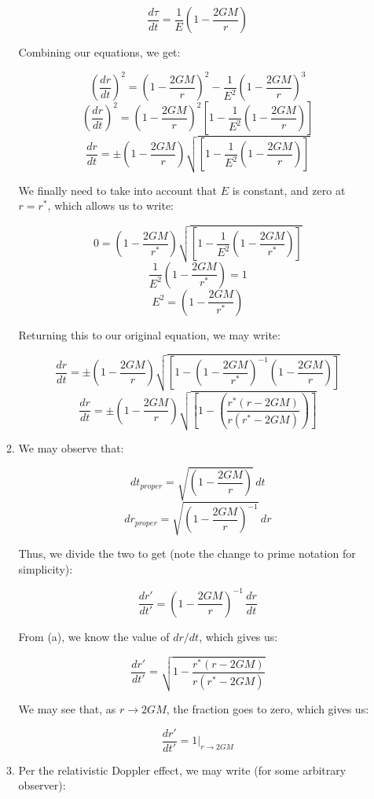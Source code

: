 \begin{enumerate}
\begin{enumerate}
        $$\frac{d\tau}{dt}=\frac{1}{E}\left( 1-\frac{2GM}{r} \right)$$

        Combining our equations, we get:

        $$\left( \frac{dr}{dt} \right)^2=\left( 1-\frac{2GM}{r} \right)^2-\frac{1}{E^2}\left( 1-\frac{2GM}{r} \right)^3$$
        $$\left( \frac{dr}{dt} \right)^2=\left( 1-\frac{2GM}{r} \right)^2\left[1-\frac{1}{E^2}\left( 1-\frac{2GM}{r} \right)\right]$$
        $$\frac{dr}{dt}=\pm\left( 1-\frac{2GM}{r} \right)\sqrt{\left[1-\frac{1}{E^2}\left( 1-\frac{2GM}{r} \right)\right]}$$

        We finally need to take into account that $E$ is constant, and zero at $r=r^*$, which allows us to write:

        $$0=\left( 1-\frac{2GM}{r^*} \right)\sqrt{\left[1-\frac{1}{E^2}\left( 1-\frac{2GM}{r^*} \right)\right]}$$
        $$\frac{1}{E^2}\left( 1-\frac{2GM}{r^*} \right)=1$$
        $$E^2=\left( 1-\frac{2GM}{r^*} \right)$$

        Returning this to our original equation, we may write:

        $$\frac{dr}{dt}=\pm\left( 1-\frac{2GM}{r} \right)\sqrt{\left[1-\left( 1-\frac{2GM}{r^*} \right)^{-1}\left( 1-\frac{2GM}{r} \right)\right]}$$
        $$\boxed{\frac{dr}{dt}=\pm\left( 1-\frac{2GM}{r} \right)\sqrt{\left[1-\left( \frac{r^*(r-2GM)}{r(r^*-2GM)}\right)\right]}}$$

      \item 

        We may observe that:

        $$dt_{proper}=\sqrt{\left( 1-\frac{2GM}{r} \right)}\,dt$$
        $$dr_{proper}=\sqrt{\left( 1-\frac{2GM}{r} \right)^{-1}}\,dr$$

        Thus, we divide the two to get (note the change to prime notation for simplicity):

        $$\frac{dr'}{dt'}=\left( 1-\frac{2GM}{r} \right)^{-1}\,\frac{dr}{dt}$$

        From (a), we know the value of $dr/dt$, which gives us:

        $$\boxed{\frac{dr'}{dt'}=\sqrt{1-\frac{r^*(r-2GM)}{r(r^*-2GM)}}}$$

        We may see that, as $r\to 2GM$, the fraction goes to zero, which gives us:

        $$\boxed{\frac{dr'}{dt'}=1\Big|_{r\to2GM}}$$

      \item 

        Per the relativistic Doppler effect, we may write (for some arbitrary observer):


\end{enumerate}
\end{enumerate}
